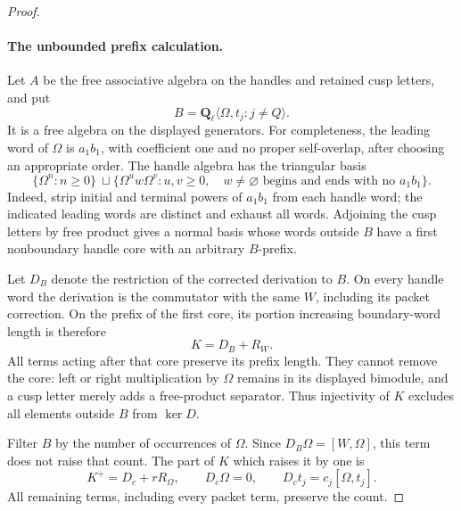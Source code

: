 \begin{proof}
\paragraph{The unbounded prefix calculation.}
Let \(A\) be the free associative algebra on the handles
and retained cusp letters, and put
\[
               B=\mathbf Q_\ell\langle\Omega,t_j:
                                                j\ne Q\rangle.
\]
It is a free algebra on the displayed generators.
For completeness, the leading word of \(\Omega\)
is \(a_1b_1\), with coefficient one and no proper
self-overlap, after choosing an appropriate order.
The handle algebra has the triangular basis
\[
 \{\Omega^n:n\ge0\}\ \sqcup
 \{\Omega^u w\Omega^v:u,v\ge0,\quad
         w\ne\varnothing\text{ begins and ends with no }a_1b_1\}.
                                                               \tag{A.40.6}
\]
Indeed, strip initial and terminal powers of
\(a_1b_1\) from each handle word; the indicated
leading words are distinct and exhaust all words.
Adjoining the cusp letters by free product gives a
normal basis whose words outside \(B\) have a first
nonboundary handle core with an arbitrary \(B\)-prefix.

Let \(D_B\) denote the restriction of the corrected
derivation to \(B\). On every handle word the
derivation is the commutator with the same \(W\),
including its packet correction. On the prefix of
the first core, its portion increasing boundary-word
length is therefore
\[
                            K=D_B+R_W.              \tag{A.40.7}
\]
All terms acting after that core preserve its prefix
length. They cannot remove the core: left or right
multiplication by \(\Omega\) remains in its displayed
bimodule, and a cusp letter merely adds a free-product
separator. Thus injectivity of \(K\) excludes all
elements outside \(B\) from \(\ker D\).

Filter \(B\) by the number of occurrences of
\(\Omega\). Since
\(D_B\Omega=[W,\Omega]\), this term does not raise
that count. The part of \(K\) which raises it by one
is
\[
  K^+=D_c+rR_\Omega,
  \qquad D_c\Omega=0,
  \qquad D_ct_j=c_j[\Omega,t_j].                    \tag{A.40.8}
\]
All remaining terms, including every packet term,
preserve the count.


\end{proof}
